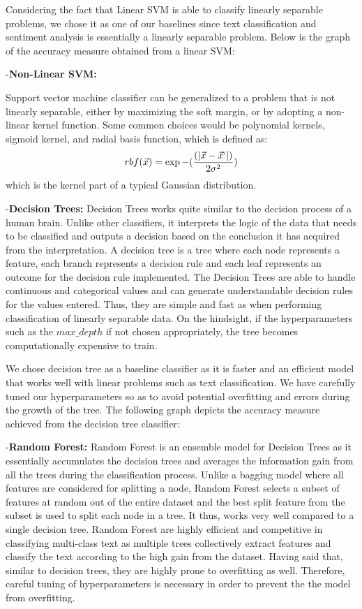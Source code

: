 \documentclass[comsoc,conference]{IEEEtran}
\begin{document}
Considering the fact that Linear SVM is able to classify linearly separable problems, we chose it as one of our baselines since text classification and sentiment analysis is essentially a linearly separable problem. Below is the graph of the accuracy measure obtained from a linear SVM:

-\textbf{Non-Linear SVM:}

Support vector machine classifier can be generalized to a problem that is not linearly separable, either by maximizing the soft margin, or by adopting a non-linear kernel function. Some common choices would be polynomial kernels, sigmoid kernel, and radial basis function, which is defined as:
\[
rbf(\vec{x}) = \exp{-(\frac{(|\vec{x}-\vec{x}`|)}{2\sigma^2})}
\]
which is the kernel part of a typical Gaussian distribution.

-\textbf{Decision Trees:} Decision Trees works quite similar to the decision process of a human brain. Unlike other classifiers, it interprets the logic of the data that needs to be classified and outputs a decision based on the conclusion it has acquired from the interpretation. A decision tree is a tree where each node represents a feature, each branch represents a decision rule and each leaf represents an outcome for the decision rule implemented. \cite{DT1} The Decision Trees are able to handle continuous and categorical values and can generate understandable decision rules for the values entered. Thus, they are simple and fast as when performing classification of linearly separable data. On the hindsight, if the hyperparameters such as the $max\_depth$ if not chosen appropriately, the tree becomes computationally expensive to train. 


We chose decision tree as a baseline classifier as it is faster and an efficient model that works well with linear problems such as text classification. We have carefully tuned our hyperparameters so as to avoid potential overfitting and errors during the growth of the tree. The following graph depicts the accuracy measure achieved from the decision tree classifier:




-\textbf{Random Forest:} Random Forest is an ensemble model for Decision Trees as it essentially accumulates the decision trees and averages the information gain from all the trees during the classification process. Unlike a bagging model where all features are considered for splitting a node, Random Forest selects a subset of features at random out of the entire dataset and the best split feature from the subset is used to split each node in a tree. It thus, works very well compared to a single decision tree. Random Forest are highly efficient and competitive in classifying multi-class text as multiple trees collectively extract features and classify the text according to the high gain from the dataset. Having said that, similar to decision trees, they are highly prone to overfitting as well. Therefore, careful tuning of hyperparameters is necessary in order to prevent the the model from overfitting. 
\end{document}

